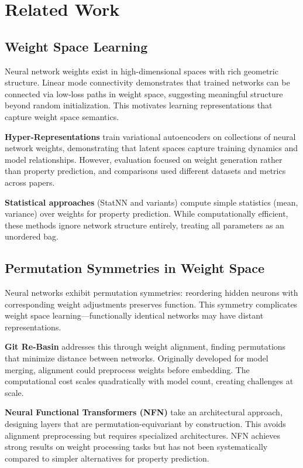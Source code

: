 \section{Related Work}

\subsection{Weight Space Learning}

Neural network weights exist in high-dimensional spaces with rich geometric structure. Linear mode connectivity demonstrates that trained networks can be connected via low-loss paths in weight space, suggesting meaningful structure beyond random initialization. This motivates learning representations that capture weight space semantics.

\textbf{Hyper-Representations} \cite{schurholt2022hyper} train variational autoencoders on collections of neural network weights, demonstrating that latent spaces capture training dynamics and model relationships. However, evaluation focused on weight generation rather than property prediction, and comparisons used different datasets and metrics across papers.

\textbf{Statistical approaches} (StatNN and variants) compute simple statistics (mean, variance) over weights for property prediction. While computationally efficient, these methods ignore network structure entirely, treating all parameters as an unordered bag.

\subsection{Permutation Symmetries in Weight Space}

Neural networks exhibit permutation symmetries: reordering hidden neurons with corresponding weight adjustments preserves function. This symmetry complicates weight space learning---functionally identical networks may have distant representations.

\textbf{Git Re-Basin} \cite{ainsworth2023git} addresses this through weight alignment, finding permutations that minimize distance between networks. Originally developed for model merging, alignment could preprocess weights before embedding. The computational cost scales quadratically with model count, creating challenges at scale.

\textbf{Neural Functional Transformers (NFN)} \cite{zhou2024neural} take an architectural approach, designing layers that are permutation-equivariant by construction. This avoids alignment preprocessing but requires specialized architectures. NFN achieves strong results on weight processing tasks but has not been systematically compared to simpler alternatives for property prediction.


